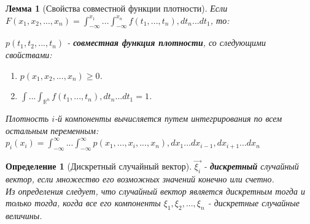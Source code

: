\documentclass[14pt]{extarticle}
\theoremstyle{breakstyle}
\newtheorem{definition}{Определение}[subsection]
\newtheorem{lemma}{Лемма}[subsection]
\begin{document}
\begin{lemma}[Свойства совместной функции плотности]

Если $F(x_1, x_2, ..., x_n) = \int_{-\infty}^{x_1} ... \int_{-\infty}^{x_n} f(t_1, ..., t_n) , dt_n ... dt_1$, то:

\vspace{\baselineskip}

$p(t_1, t_2, ..., t_n)$ - \textbf{совместная функция плотности}, со следующими свойствами:
\begin{enumerate}
    \item $p(x_{1}, x_{2}, ..., x_{n}) \geq 0$.
    \item $\int ... \int_{\mathbb{R}^{n}} f(t_1, ..., t_n) , dt_n ... dt_1 = 1$.
\end{enumerate}

\vspace{\baselineskip}

Плотность $i$-й компоненты вычисляется путем интегрирования по всем остальным переменным: \\
$p_i(x_i) = \int_{-\infty}^{\infty} ... \int_{-\infty}^{\infty} p(x_1, ..., x_i, ..., x_n) , dx_1 ... dx_{i-1} , dx_{i+1} ... dx_n$

\end{lemma}

\begin{definition}[Дискретный случайный вектор]

$\vec{\xi_{i}}$ - \textbf{дискретный} случайный вектор, если множество его возможных значений конечно или счетно.\\
Из определения следует, что случайный вектор является дискретным тогда и только тогда, когда все его компоненты $\xi_{1}, \xi_{2}, ..., \xi_{n}$ - дискретные случайные величины.

\end{definition}
\end{document}
